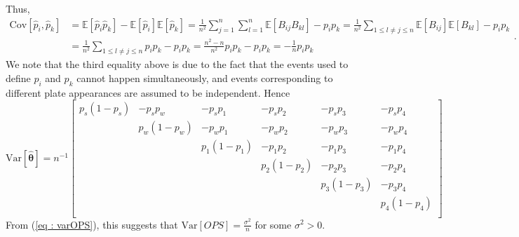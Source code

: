 \documentclass [52pt] {article}
\newcommand{\Exp}{\mathbb{E}}
\newcommand{\var}{\text{Var}}
\newcommand{\cov}{\text{Cov}}
\begin{document}
Thus,
\[\begin{split}
\cov[\hat{p}_i,\hat{p}_k] &= \Exp[\hat{p}_i\hat{p}_k]-\Exp[\hat{p}_i]\Exp[\hat{p}_k] = \frac{1}{n^2}\sum_{j=1}^n\sum_{l=1}^n\Exp[B_{ij}B_{kl}] - p_ip_k=\frac{1}{n^2}\sum_{1\le l\not= j\le n} \Exp[B_{ij}]\Exp[B_{kl}]-p_ip_k\\
&=\frac{1}{n^2}\sum_{1\le l\not= j\le n} p_ip_k -p_ip_k=\frac{n^2-n}{n^2} p_ip_k -p_ip_k = -\frac{1}{n}p_i p_k
\end{split}.\]
We note that the third equality above is due to the fact that the events used to define $p_i$ and $p_k$ cannot happen simultaneously, and events corresponding to different plate appearances are assumed to be independent.  Hence 
\[\var[\hat{\pmb{\theta}}] =n^{-1}\begin{bmatrix}
p_s(1-p_s) & -p_sp_w& -p_sp_1 & -p_sp_2 & -p_s p_3& -p_s p_4\\[0.5em]
& p_w(1-p_w)& -p_wp_1 & -p_wp_2& -p_wp_3 & -p_w p_4\\[0.5em]
&& p_1(1-p_1)& -p_1p_2& -p_1p_3& -p_1p_4\\[0.5em]
&&& p_2(1-p_2) & -p_2p_3& -p_2p_4\\[0.5em]
&&&& p_3(1-p_3) & -p_3p_4\\[0.5em]
&&&&&p_4(1-p_4)\\
\end{bmatrix}\]
From (\ref{eq : varOPS}), this suggests that $\var[OPS] =\frac{\sigma^2}{n}$ for some $\sigma^2>0$. \\
\end{document}
